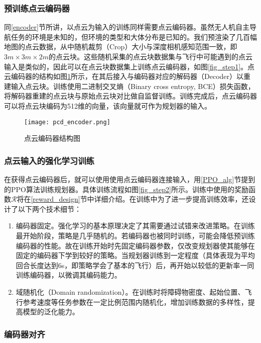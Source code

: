 \subsubsection{预训练点云编码器}
同\ref{encoder}节所讲，以点云为输入的训练同样需要点云编码器。虽然无人机自主导航任务的环境是未知的，但环境的类型和大体分布是已知的。我们预渲染了几百幅地图的点云数据，从中随机裁剪（Crop）大小与深度相机感知范围一致，即$3m\times 3m\times 2m$的点云块。这些随机采集的点云块数据集与飞行中可能遇到的点云输入是类似的，因此可以在点云块数据集上训练点云编码器，如图\ref{fig_step1}。点云编码器的结构如图\ref{fig_pcd_encoder}所示，在其后接入与编码器对应的解码器（Decoder）以重建输入点云块。训练使用二进制交叉熵（Binary cross entropy, BCE）损失函数，将解码器重建的点云块与原始点云块对比做自监督训练。训练完成后，点云编码器可以将点云块编码为512维的向量，该向量就可作为规划器的输入。

\begin{figure}
  \centering
  \texttt{[image: pcd\_encoder.png]}
  \caption{点云编码器结构图}
  \label{fig_pcd_encoder}
\end{figure}

\subsubsection{点云输入的强化学习训练}
在获得点云编码器后，就可以使用使用点云编码器连接输入，用\ref{PPO_alg}节提到的PPO算法训练规划器。具体训练流程如图\ref{fig_step2}所示。训练中使用的奖励函数$\mathcal{R}$将在\ref{reward_design}节中详细介绍。在训练中为了进一步提高训练效率，还设计了以下两个技术细节：
\begin{enumerate}
  \item 编码器固定。强化学习的基本原理决定了其需要通过试错来改进策略。在训练最开始阶段，策略是几乎随机的。若编码器也被同时训练，可能会降低预训练编码器的性能。故在训练开始时先固定编码器参数，仅改变规划器使其能够在固定的编码器下学到较好的策略。当规划器训练到一定程度（具体表现为平均回合长度达到6s，即策略学会了基本的飞行）后，再开始以较低的更新率一同训练编码器，以微调其编码能力。
  \item 域随机化（Domain randomization）。在训练时将障碍物密度、起始位置、飞行参考速度等任务参数在一定比例范围内随机化，增加训练数据的多样性，提高模型的泛化能力。
\end{enumerate}

\subsubsection{编码器对齐}

